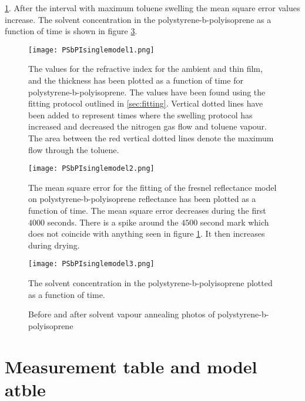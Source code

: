 \documentclass[MasterThesisMain.tex]{subfiles}
\begin{document}
\ref{fig:PSbPIsinglemodel1}. After the interval with maximum toluene swelling the mean square error values increase. The solvent concentration in the polystyrene-b-polyisoprene as a function of time is shown in figure \ref{fig:PSbPIsinglemodel3}. 

\begin{figure}[H]
\centering
\texttt{[image: PSbPIsinglemodel1.png]}
\caption{The values for the refractive index for the ambient and thin film, and the thickness has been plotted as a function of time for polystyrene-b-polyisoprene. The values have been found using the fitting protocol outlined in \ref{sec:fitting}. Vertical dotted lines have been added to represent times where the swelling protocol has increased and decreased the nitrogen gas flow and toluene vapour. The area between the red vertical dotted lines denote the maximum flow through the toluene.}
\label{fig:PSbPIsinglemodel1}
\end{figure}

\begin{figure}[H]
\centering
\texttt{[image: PSbPIsinglemodel2.png]}
\caption{The mean square error for the fitting of the fresnel reflectance model on polystyrene-b-polyisoprene reflectance has been plotted as a function of time. The mean square error decreases during the first $4000$ seconds. There is a spike around the $4500$ second mark which does not coincide with anything seen in figure \ref{fig:PSbPIsinglemodel1}. It then increases during drying.}
\label{fig:PSbPIsinglemodel2}
\end{figure}

\begin{figure}[H]
\centering
\texttt{[image: PSbPIsinglemodel3.png]}
\caption{The solvent concentration in the polystyrene-b-polyisoprene plotted as a function of time.}
\label{fig:PSbPIsinglemodel3}
\end{figure}

\begin{figure}
\centering     
{}
\caption{Before and after solvent vapour annealing photos of polystyrene-b-polyisoprene}
\end{figure}



\section{Measurement table and model atble}
\end{document}
